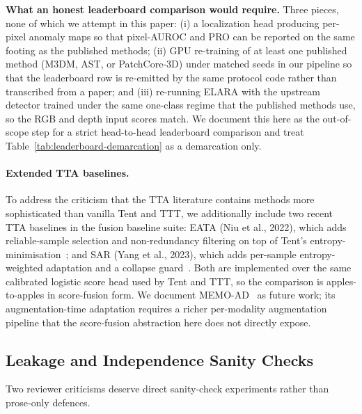 \documentclass[10pt,conference]{IEEEtran}
\newcommand{\system}{ELARA}
\begin{document}
\noindent\textbf{What an honest leaderboard comparison would require.}
Three pieces, none of which we attempt in this paper: (i) a localization
head producing per-pixel anomaly maps so that pixel-AUROC and PRO can
be reported on the same footing as the published methods; (ii) GPU
re-training of at least one published method (M3DM, AST, or
PatchCore-3D) under matched seeds in our pipeline so that the
leaderboard row is re-emitted by the same protocol code rather than
transcribed from a paper; and (iii) re-running \system{} with the
upstream detector trained under the same one-class regime that the
published methods use, so the RGB and depth input scores match. We
document this here as the out-of-scope step for a strict head-to-head
leaderboard comparison and treat Table~\ref{tab:leaderboard-demarcation} as a
demarcation only.

\paragraph{Extended TTA baselines.} To address the criticism that the
TTA literature contains methods more sophisticated than vanilla Tent
and TTT, we additionally include two recent TTA baselines in the
fusion baseline suite: EATA (Niu et al., 2022), which adds
reliable-sample selection and non-redundancy filtering on top of
Tent's entropy-minimisation~\cite{niu2022efficient}; and
SAR (Yang et al., 2023), which adds per-sample entropy-weighted
adaptation and a collapse guard~\cite{yang2023sar}. Both are
implemented over the same calibrated logistic score head used by Tent
and TTT, so the comparison is apples-to-apples in score-fusion form.
We document MEMO-AD~\cite{zhang2022memo} as future work; its
augmentation-time adaptation requires a richer per-modality
augmentation pipeline that the score-fusion abstraction here does
not directly expose.

\subsection{Leakage and Independence Sanity Checks}
\label{sec:leakage-checks}

Two reviewer criticisms deserve direct sanity-check experiments rather
than prose-only defences.
\end{document}
